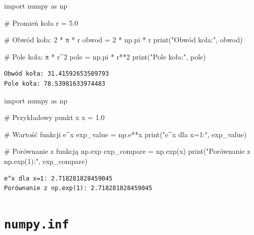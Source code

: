 \documentclass[
  polish,
  letterpaper,
  DIV=11,
  numbers=noendperiod]{scrreprt}
\newenvironment{Shaded}{\begin{snugshade}}{\end{snugshade}}
\newcommand{\BuiltInTok}[1]{\textcolor[rgb]{0.00,0.23,0.31}{#1}}
\newcommand{\CommentTok}[1]{\textcolor[rgb]{0.37,0.37,0.37}{#1}}
\newcommand{\DecValTok}[1]{\textcolor[rgb]{0.68,0.00,0.00}{#1}}
\newcommand{\FloatTok}[1]{\textcolor[rgb]{0.68,0.00,0.00}{#1}}
\newcommand{\ImportTok}[1]{\textcolor[rgb]{0.00,0.46,0.62}{#1}}
\newcommand{\NormalTok}[1]{\textcolor[rgb]{0.00,0.23,0.31}{#1}}
\newcommand{\OperatorTok}[1]{\textcolor[rgb]{0.37,0.37,0.37}{#1}}
\newcommand{\StringTok}[1]{\textcolor[rgb]{0.13,0.47,0.30}{#1}}
\begin{document}
\begin{Shaded}
\begin{Highlighting}[]
\ImportTok{import}\NormalTok{ numpy }\ImportTok{as}\NormalTok{ np}

\CommentTok{\# Promień koła}
\NormalTok{r }\OperatorTok{=} \FloatTok{5.0}

\CommentTok{\# Obwód koła: 2 * π * r}
\NormalTok{obwod }\OperatorTok{=} \DecValTok{2} \OperatorTok{*}\NormalTok{ np.pi }\OperatorTok{*}\NormalTok{ r}
\BuiltInTok{print}\NormalTok{(}\StringTok{"Obwód koła:"}\NormalTok{, obwod)}

\CommentTok{\# Pole koła: π * r\^{}2}
\NormalTok{pole }\OperatorTok{=}\NormalTok{ np.pi }\OperatorTok{*}\NormalTok{ r}\OperatorTok{**}\DecValTok{2}
\BuiltInTok{print}\NormalTok{(}\StringTok{"Pole koła:"}\NormalTok{, pole)}
\end{Highlighting}
\end{Shaded}

\begin{verbatim}
Obwód koła: 31.41592653589793
Pole koła: 78.53981633974483
\end{verbatim}

\begin{Shaded}
\begin{Highlighting}[]
\ImportTok{import}\NormalTok{ numpy }\ImportTok{as}\NormalTok{ np}

\CommentTok{\# Przykładowy punkt x}
\NormalTok{x }\OperatorTok{=} \FloatTok{1.0}

\CommentTok{\# Wartość funkcji e\^{}x}
\NormalTok{exp\_value }\OperatorTok{=}\NormalTok{ np.e}\OperatorTok{**}\NormalTok{x}
\BuiltInTok{print}\NormalTok{(}\StringTok{"e\^{}x dla x=1:"}\NormalTok{, exp\_value)}

\CommentTok{\# Porównanie z funkcją np.exp}
\NormalTok{exp\_compare }\OperatorTok{=}\NormalTok{ np.exp(x)}
\BuiltInTok{print}\NormalTok{(}\StringTok{"Porównanie z np.exp(1):"}\NormalTok{, exp\_compare)}
\end{Highlighting}
\end{Shaded}

\begin{verbatim}
e^x dla x=1: 2.718281828459045
Porównanie z np.exp(1): 2.718281828459045
\end{verbatim}

\section{\texorpdfstring{\texttt{numpy.inf}}{numpy.inf}}\label{numpy.inf}
\end{document}

